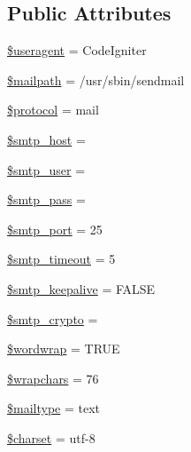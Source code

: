\subsection*{Public Attributes}
\begin{DoxyCompactItemize}
\item 
\mbox{\hyperlink{class_c_i___email_adc6d59b7c0768eeffafe3b78c4836959}{\$useragent}} = \textquotesingle{}Code\+Igniter\textquotesingle{}
\item 
\mbox{\hyperlink{class_c_i___email_a23dd98b1852b9e73c20292b2cc96b20f}{\$mailpath}} = \textquotesingle{}/usr/sbin/sendmail\textquotesingle{}
\item 
\mbox{\hyperlink{class_c_i___email_ac01bf1cf041487498864d054b991f570}{\$protocol}} = \textquotesingle{}mail\textquotesingle{}
\item 
\mbox{\hyperlink{class_c_i___email_aa1ef5144d9ef39807b72f29299128eb1}{\$smtp\+\_\+host}} = \textquotesingle{}\textquotesingle{}
\item 
\mbox{\hyperlink{class_c_i___email_ac77010332fb55af4ed3ac38f0e39114d}{\$smtp\+\_\+user}} = \textquotesingle{}\textquotesingle{}
\item 
\mbox{\hyperlink{class_c_i___email_ae8b7daa14d7182bd564f04f752948400}{\$smtp\+\_\+pass}} = \textquotesingle{}\textquotesingle{}
\item 
\mbox{\hyperlink{class_c_i___email_af98a134522a65f513cff2718fc74968f}{\$smtp\+\_\+port}} = 25
\item 
\mbox{\hyperlink{class_c_i___email_afd19e9cbfc82dd26a270fccd29e29728}{\$smtp\+\_\+timeout}} = 5
\item 
\mbox{\hyperlink{class_c_i___email_a3ea493da94ea80d0439937af4eab7621}{\$smtp\+\_\+keepalive}} = F\+A\+L\+SE
\item 
\mbox{\hyperlink{class_c_i___email_ab324ab40108bacab087e18556627ef1e}{\$smtp\+\_\+crypto}} = \textquotesingle{}\textquotesingle{}
\item 
\mbox{\hyperlink{class_c_i___email_abc150a71df67310da874f7399ab5f2cd}{\$wordwrap}} = T\+R\+UE
\item 
\mbox{\hyperlink{class_c_i___email_a8834e27a87a8b935ab1155d1d7bd44d2}{\$wrapchars}} = 76
\item 
\mbox{\hyperlink{class_c_i___email_a7f4dd7af7642585306869f8985ab744f}{\$mailtype}} = \textquotesingle{}text\textquotesingle{}
\item 
\mbox{\hyperlink{class_c_i___email_af10158dd74b75f1d337e83102d6b82ce}{\$charset}} = \textquotesingle{}utf-\/8\textquotesingle{}
\item 

\end{DoxyCompactItemize}
